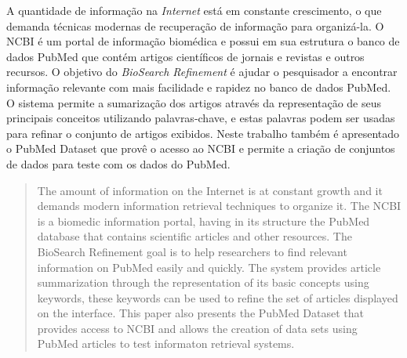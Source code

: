 \begin{resumo}
A quantidade de informação na \emph{Internet} está em constante crescimento, o que demanda técnicas modernas de recuperação de informação para organizá-la. O NCBI é um portal de informação biomédica e possui em sua estrutura o banco de dados PubMed que contém artigos científicos de jornais e revistas e outros recursos. O objetivo do \emph{BioSearch Refinement} é ajudar o pesquisador a encontrar informação relevante com mais facilidade e rapidez no banco de dados PubMed. O sistema permite a sumarização dos artigos através da representação de seus principais conceitos utilizando palavras-chave, e estas palavras podem ser usadas para refinar o conjunto de artigos exibidos. Neste trabalho também é apresentado o PubMed Dataset que provê o acesso ao NCBI e permite a criação de conjuntos de dados para teste com os dados do PubMed.
\end{resumo}

\begin{abstract}
The amount of information on the Internet is at constant growth and it demands modern information retrieval techniques to organize it. The NCBI is a biomedic information portal, having in its structure the PubMed database that contains scientific articles and other resources. The BioSearch Refinement goal is to help researchers to find relevant information on PubMed easily and quickly. The system provides article summarization through the representation of its basic concepts using keywords, these keywords can be used to refine the set of articles displayed on the interface. This paper also presents the PubMed Dataset that provides access to NCBI and allows the creation of data sets using PubMed articles to test informaton retrieval systems.
\end{abstract}

